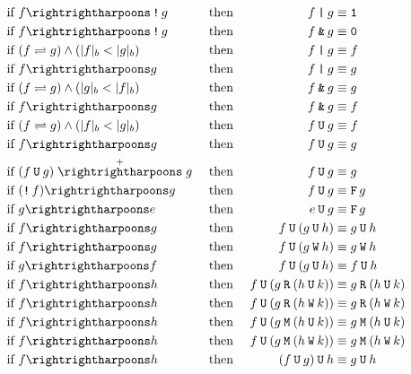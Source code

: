 \documentclass[a4paper,twoside,10pt,DIV=12]{scrreprt}
\DeclareMathOperator{\F}{\texttt{F}}
\newcommand{\U}{\mathbin{\texttt{U}}}
\newcommand{\R}{\mathbin{\texttt{R}}}
\newcommand{\M}{\mathbin{\texttt{M}}}
\newcommand{\W}{\mathbin{\texttt{W}}}
\DeclareMathOperator{\NOT}{\texttt{!}}
\newcommand{\OR}{\mathbin{\texttt{|}}}
\newcommand{\AND}{\mathbin{\texttt{\&}}}
\newcommand{\0}{\texttt{0}}
\newcommand{\1}{\texttt{1}}
\def\simp{\rightrightharpoons}
\def\Simp{\stackrel{+}{\simp}}
\begin{document}
\begingroup
\allowdisplaybreaks
\begin{alignat*}{3}
\text{if~} & f\simp \NOT g   && \text{~then~} & f\OR g              & \equiv \1              \\
\text{if~} & f\simp \NOT g   && \text{~then~} & f\AND g             & \equiv \0              \\
\text{if~} & \flessg         && \text{~then~} & f\OR g              & \equiv f               \\
\text{if~} & f\simp g        && \text{~then~} & f\OR g              & \equiv g               \\
\text{if~} & \glessf         && \text{~then~} & f\AND g             & \equiv g               \\
\text{if~} & f\simp g        && \text{~then~} & f\AND g             & \equiv f               \\
\text{if~} & \flessg         && \text{~then~} & f\U g               & \equiv f               \\
\text{if~} & f\simp g        && \text{~then~} & f\U g               & \equiv g               \\
\text{if~} & (f\U g)\Simp g  && \text{~then~} & f\U g               & \equiv g               \\
\text{if~} & (\NOT f)\simp g && \text{~then~} & f\U g               & \equiv \F g            \\
\text{if~} & g\simp e        && \text{~then~} & e\U g               & \equiv \F g            \\
\text{if~} & f\simp g        && \text{~then~} & f\U (g \U h)        & \equiv g \U h          \\
\text{if~} & f\simp g        && \text{~then~} & f\U (g \W h)        & \equiv g \W h          \\
\text{if~} & g\simp f        && \text{~then~} & f\U (g \U h)        & \equiv f \U h          \\
\text{if~} & f\simp h        && \text{~then~} & f\U (g \R (h \U k)) & \equiv g \R (h \U k)   \\
\text{if~} & f\simp h        && \text{~then~} & f\U (g \R (h \W k)) & \equiv g \R (h \W k)   \\
\text{if~} & f\simp h        && \text{~then~} & f\U (g \M (h \U k)) & \equiv g \M (h \U k)   \\
\text{if~} & f\simp h        && \text{~then~} & f\U (g \M (h \W k)) & \equiv g \M (h \W k)   \\
\text{if~} & f\simp h        && \text{~then~} & (f\U g) \U h        & \equiv g \U h          \\

\end{alignat*}
\end{document}
